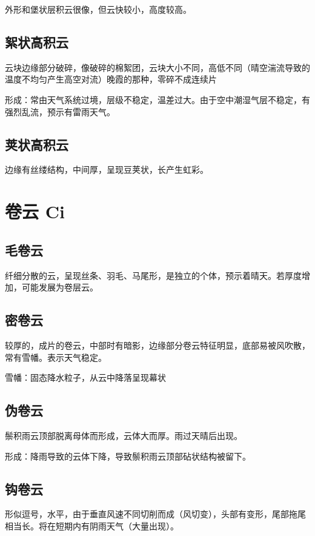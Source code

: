 \documentclass[UTF8,11pt]{ctexbook}
\begin{document}
外形和堡状层积云很像，但云快较小，高度较高。

\subsection{絮状高积云}

云块边缘部分破碎，像破碎的棉絮团，云块大小不同，高低不同（晴空湍流导致的温度不均匀产生高空对流）晚霞的那种，零碎不成连续片

形成：常由天气系统过境，层级不稳定，温差过大。由于空中潮湿气层不稳定，有强烈乱流，预示有雷雨天气。

\subsection{荚状高积云}

边缘有丝缕结构，中间厚，呈现豆荚状，长产生虹彩。

\section{卷云 Ci}

\subsection{毛卷云}

纤细分散的云，呈现丝条、羽毛、马尾形，是独立的个体，预示着晴天。若厚度增加，可能发展为卷层云。

\subsection{密卷云}

较厚的，成片的卷云，中部时有暗影，边缘部分卷云特征明显，底部易被风吹散，常有雪幡。表示天气稳定。

雪幡：固态降水粒子，从云中降落呈现幕状

\subsection{伪卷云}

鬃积雨云顶部脱离母体而形成，云体大而厚。雨过天晴后出现。

形成：降雨导致的云体下降，导致鬃积雨云顶部砧状结构被留下。

\subsection{钩卷云}

形似逗号，水平，由于垂直风速不同切削而成（风切变），头部有变形，尾部拖尾相当长。将在短期内有阴雨天气（大量出现）。
\end{document}
